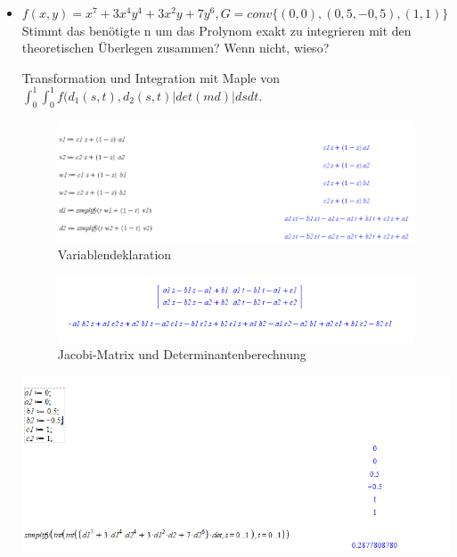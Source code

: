 \documentclass[a4paper,11pt,bibliography=totoc,listof=totoc,headinclude=true,cleardoublepage=empty,oneside]{scrbook}
\begin{document}
		
		\color{change2}
		\par
		\begingroup
		\leftskip=1cm %
		\noindent %
		\begin{itemize}
				
			\item $f(x,y)= x^7+3x^4y^4+3x^2y+7y^6 , G=conv\{(0,0),(0,5,-0,5),(1,1)\}$ \\
			Stimmt das benötigte n um das Prolynom exakt zu integrieren mit den theoretischen Überlegen zusammen? Wenn nicht, wieso?
			

				
				
		\color{change2}
		Transformation und Integration mit Maple von 
		$\int_{0}^{1}\int_{0}^{1}f(d_1(s,t),d_2(s,t)|det(md)|dsdt$.
		
		
			\begin{figure}
				\centering
				\includegraphics[width=1\textwidth]{tria_mw1.png}
				\caption{Variablendeklaration}
				\label{fig:Bild1}
			\end{figure}
			
		
		
		
			
				\begin{figure}
			\centering
			\includegraphics[width=1\textwidth]{mw12.png}
			\caption{Jacobi-Matrix und Determinantenberechnung}
			\label{fig:Bild1}
			\end{figure}
			
		
			
			
				\centering
				\includegraphics[width=1\textwidth]{tria_mw4.png}
				\caption{Endresultat}
				\label{fig:Bild1}
			

\end{itemize}
\end{document}
